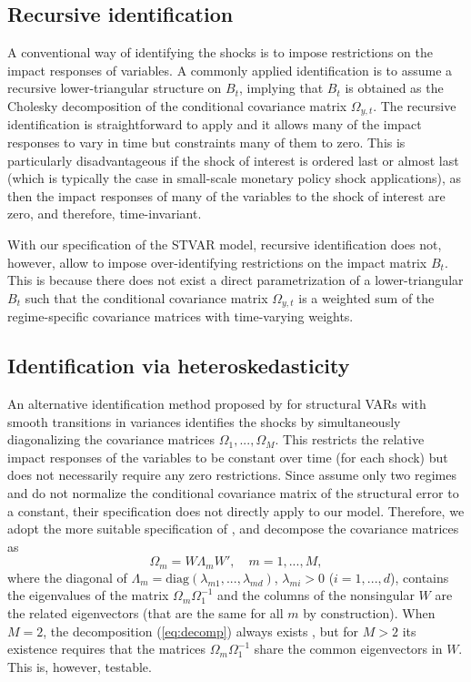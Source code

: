 \documentclass[nojss]{jss}
\begin{document}
\subsection{Recursive identification}
A conventional way of identifying the shocks is to impose restrictions on the impact responses of variables. A commonly applied identification is to assume a recursive lower-triangular structure on $B_t$, implying that $B_t$ is obtained as the Cholesky decomposition of the conditional covariance matrix $\Omega_{y,t}$. The recursive identification is straightforward to apply and it allows many of the impact responses to vary in time but constraints many of them to zero. This is particularly disadvantageous if the shock of interest is ordered last or almost last (which is typically the case in small-scale monetary policy shock applications), as then the impact responses of many of the variables to the shock of interest are zero, and therefore, time-invariant.

With our specification of the STVAR model, recursive identification does not, however, allow to impose over-identifying restrictions on the impact matrix $B_t$. This is because there does not exist a direct parametrization of a lower-triangular $B_t$ such that the conditional covariance matrix $\Omega_{y,t}$ is a weighted sum of the regime-specific covariance matrices with time-varying weights.

\subsection{Identification via heteroskedasticity}
An alternative identification method proposed by \cite{Lutkepohl+Netsunajev:2017} for structural VARs with smooth transitions in variances \citep[see also the seminal paper by][]{Rigobon:2003} identifies the shocks by simultaneously diagonalizing the covariance matrices $\Omega_1,...,\Omega_M$. This restricts the relative impact responses of the variables to be constant over time (for each shock) but does not necessarily require any zero restrictions. Since \cite{Lutkepohl+Netsunajev:2017} assume only two regimes and do not normalize the conditional covariance matrix of the structural error to a constant, their specification does not directly apply to our model. Therefore, we adopt the more suitable specification of \cite{Virolainen:2024}, and decompose the covariance matrices as
\begin{equation}\label{eq:decomp}
\Omega_m=W\Lambda_mW', \quad m=1,...,M,
\end{equation}
where the diagonal of $\Lambda_m=\text{diag}(\lambda_{m1},...,\lambda_{md})$, $\lambda_{mi}>0$ ($i=1,...,d$), contains the eigenvalues of the matrix $\Omega_m\Omega_1^{-1}$ and the columns of the nonsingular $W$ are the related eigenvectors (that are the same for all $m$ by construction). When $M=2$, the decomposition (\ref{eq:decomp}) always exists \citep[Theorem A9.9]{Muirhead:1982}, but for $M>2$ its existence requires that the matrices $\Omega_m\Omega_1^{-1}$ share the common eigenvectors in $W$. This is, however, testable.
\end{document}
